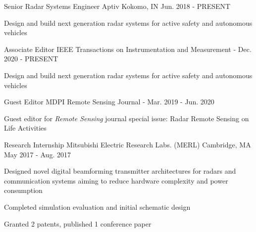 
\begin{cventries}

    \cventry
        {Senior Radar Systems Engineer}
        {Aptiv}
        {Kokomo, IN}
        {Jun. 2018 - PRESENT}
        {
            \begin{cvitems}
                \item {Design and build next generation radar systems for active safety and autonomous vehicles}
            \end{cvitems}
        }
    
    \cventry
        {Associate Editor}
        {IEEE Transactions on Instrumentation and Measurement}
        {-}
        {Dec. 2020 - PRESENT}
        {
            \begin{cvitems}
                \item {Design and build next generation radar systems for active safety and autonomous vehicles}
            \end{cvitems}
        }
        
    \cventry
        {Guest Editor}
        {MDPI Remote Sensing Journal}
        {-}
        {Mar. 2019 - Jun. 2020}
        {
            \begin{cvitems}
                \item {Guest editor for {\em{Remote Sensing}} journal special issue: Radar Remote Sensing on Life Activities}
            \end{cvitems}
        }

    \cventry
        {Research Internship}
        {Mitsubishi Electric Research Labs. (MERL)}
        {Cambridge, MA}
        {May 2017 - Aug. 2017}
        {
            \begin{cvitems}
                \item {Designed novel digital beamforming transmitter architectures for radars and communication systems aiming to reduce hardware complexity and power consumption}
                \item {Completed simulation evaluation and initial schematic design}
                \item {Granted 2 patents, published 1 conference paper}
            \end{cvitems}
        }

\end{cventries}
